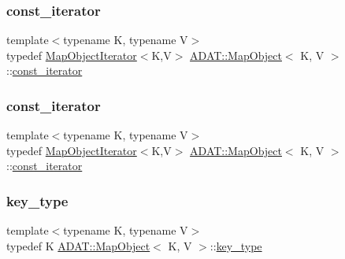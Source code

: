 \subsubsection{\texorpdfstring{const\_iterator}{const\_iterator}\hspace{0.1cm}{\footnotesize\ttfamily [1/2]}}
{\footnotesize\ttfamily template$<$typename K, typename V$>$ \\
typedef \mbox{\hyperlink{classADAT_1_1MapObjectIterator}{Map\+Object\+Iterator}}$<$K,V$>$ \mbox{\hyperlink{classADAT_1_1MapObject}{A\+D\+A\+T\+::\+Map\+Object}}$<$ K, V $>$\+::\mbox{\hyperlink{classADAT_1_1MapObject_a4622cd7d3b6fed18fe226d28091cc6c8}{const\+\_\+iterator}}}

\mbox{\label{classADAT_1_1MapObject_a4622cd7d3b6fed18fe226d28091cc6c8}} 
\subsubsection{\texorpdfstring{const\_iterator}{const\_iterator}\hspace{0.1cm}{\footnotesize\ttfamily [2/2]}}
{\footnotesize\ttfamily template$<$typename K, typename V$>$ \\
typedef \mbox{\hyperlink{classADAT_1_1MapObjectIterator}{Map\+Object\+Iterator}}$<$K,V$>$ \mbox{\hyperlink{classADAT_1_1MapObject}{A\+D\+A\+T\+::\+Map\+Object}}$<$ K, V $>$\+::\mbox{\hyperlink{classADAT_1_1MapObject_a4622cd7d3b6fed18fe226d28091cc6c8}{const\+\_\+iterator}}}

\mbox{\label{classADAT_1_1MapObject_a98d458cd1ecd1265ae5451619de933db}} 
\subsubsection{\texorpdfstring{key\_type}{key\_type}\hspace{0.1cm}{\footnotesize\ttfamily [1/2]}}
{\footnotesize\ttfamily template$<$typename K, typename V$>$ \\
typedef K \mbox{\hyperlink{classADAT_1_1MapObject}{A\+D\+A\+T\+::\+Map\+Object}}$<$ K, V $>$\+::\mbox{\hyperlink{classADAT_1_1MapObject_a98d458cd1ecd1265ae5451619de933db}{key\+\_\+type}}}



